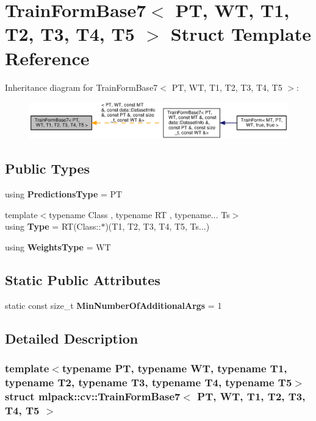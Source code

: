 \section{Train\+Form\+Base7$<$ PT, WT, T1, T2, T3, T4, T5 $>$ Struct Template Reference}
\label{structmlpack_1_1cv_1_1TrainFormBase7}


Inheritance diagram for Train\+Form\+Base7$<$ PT, WT, T1, T2, T3, T4, T5 $>$\+:
\nopagebreak
\begin{figure}[H]
\begin{center}
\leavevmode
\includegraphics[width=350pt]{structmlpack_1_1cv_1_1TrainFormBase7__inherit__graph}
\end{center}
\end{figure}
\subsection*{Public Types}
\begin{DoxyCompactItemize}
\item 
using \textbf{ Predictions\+Type} = PT
\item 
{\footnotesize template$<$typename Class , typename RT , typename... Ts$>$ }\\using \textbf{ Type} = RT(Class\+::$\ast$)(T1, T2, T3, T4, T5, Ts...)
\item 
using \textbf{ Weights\+Type} = WT
\end{DoxyCompactItemize}
\subsection*{Static Public Attributes}
\begin{DoxyCompactItemize}
\item 
static const size\+\_\+t \textbf{ Min\+Number\+Of\+Additional\+Args} = 1
\end{DoxyCompactItemize}


\subsection{Detailed Description}
\subsubsection*{template$<$typename PT, typename WT, typename T1, typename T2, typename T3, typename T4, typename T5$>$\newline
struct mlpack\+::cv\+::\+Train\+Form\+Base7$<$ P\+T, W\+T, T1, T2, T3, T4, T5 $>$}



